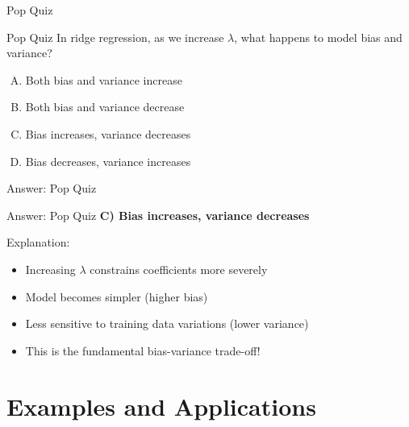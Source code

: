 \documentclass{beamer}
\begin{document}
\begin{frame}{Pop Quiz \thepopquiz}
\begin{popquizbox}{Pop Quiz \thepopquiz}
In ridge regression, as we increase $\lambda$, what happens to model bias and variance?
\begin{enumerate}[A)]
\item Both bias and variance increase
\item Both bias and variance decrease
\item Bias increases, variance decreases
\item Bias decreases, variance increases
\end{enumerate}
\end{popquizbox}
\end{frame}

\begin{frame}{Answer: Pop Quiz \thepopquiz}
\begin{popquizbox}{Answer: Pop Quiz \thepopquiz}
\textbf{C) Bias increases, variance decreases}

\vspace{0.3cm}
Explanation:
\begin{itemize}
\item Increasing $\lambda$ constrains coefficients more severely
\item Model becomes simpler (higher bias)
\item Less sensitive to training data variations (lower variance)
\item This is the fundamental bias-variance trade-off!
\end{itemize}
\end{popquizbox}
\end{frame}

\section{Examples and Applications}
\end{document}
